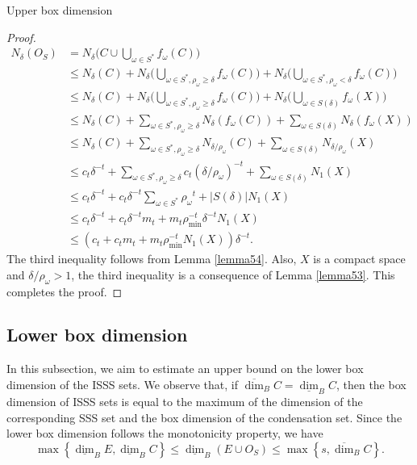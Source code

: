 \documentclass[12pt,oneside,reqno]{amsart}
\theoremstyle{definition}
\theoremstyle{remark}
\begin{document}
\begin{subsection}{Upper box dimension}
\begin{proof}
\begin{equation*}
\begin{aligned}
         N_\delta(O_S) &=  N_\delta \bigg( C \cup \bigcup_{\omega \in S^*} f_\omega(C) \bigg) \\& \le N_\delta (C) + N_{\delta} \bigg( \bigcup_{\omega \in S^*, \rho_\omega \ge \delta} f_\omega (C) \bigg) +N_{\delta} \bigg( \bigcup_{\omega \in S^*, \rho_\omega < \delta} f_\omega (C) \bigg) \\& \le N_\delta (C) + N_{\delta} \bigg( \bigcup_{\omega \in S^*, \rho_\omega \ge \delta} f_\omega (C) \bigg) +N_{\delta} \bigg( \bigcup_{\omega \in S(\delta)} f_\omega (X) \bigg) \\& \le N_\delta (C) +  \sum_{\omega \in S^*, \rho_\omega \ge \delta}  N_{\delta}(f_\omega (C) ) + \sum_{\omega \in S(\delta)} N_{\delta}(f_\omega (X)) \\& \le N_\delta (C) +  \sum_{\omega \in S^*, \rho_\omega \ge \delta}  N_{{\delta}/{\rho_\omega}}(C)  + \sum_{\omega \in S(\delta)} N_{{\delta}/{\rho_\omega}} (X) \\& \le c_t \delta^{-t} + \sum_{\omega \in S^*, \rho_\omega \ge \delta}  c_t({\delta}/{\rho_\omega})^{-t} +\sum_{\omega \in S(\delta)} N_1(X) \\& \le  c_t \delta^{-t} + c_t \delta^{-t} \sum_{\omega \in S^*}  {\rho_\omega}^{t} +|S(\delta)| N_1(X) \\& \le  c_t \delta^{-t} + c_t \delta^{-t} m_t + m_t {\rho}^{-t}_{\min} \delta^{-t} N_1(X) \\& \le  (c_t + c_t m_t + m_t {\rho}^{-t}_{\min}  N_1(X))\delta^{-t}.
        \end{aligned}
    \end{equation*}
    The third inequality follows from Lemma \ref{lemma54}. Also, $X$ is a compact space and $\delta / \rho_\omega > 1$, the third inequality is a consequence of Lemma \ref{lemma53}. This completes the proof.  
\end{proof}
\end{subsection}
\subsection{Lower box dimension}
In this subsection, we aim to estimate an upper bound on the lower box dimension of the ISSS sets. We observe that, if $\overline{\dim}_B C = \underline{\dim}_B C$, then the box dimension of ISSS sets is equal to the maximum of the dimension of the corresponding SSS set and the box dimension of the condensation set. Since the lower box dimension follows the monotonicity property, we have
\[
\max \left\{ \underline{\dim}_B E, \underline{\dim}_B C \right\} \leq \underline{\dim}_B (E \cup O_S) \leq \max \left\{ s, \overline{\dim}_B C \right\}.
\]
\end{document}
